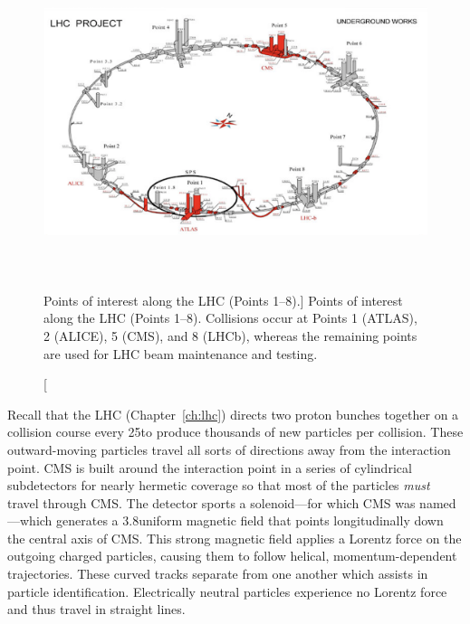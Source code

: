 \begin{figure}[b]
    \centering
    \includegraphics[height=9cm,keepaspectratio]{figures/cms/lhc_points_with_buildings.png}
        \caption
            [Points of interest along the LHC (Points 1--8).]
            {Points of interest along the LHC (Points 1--8).
            Collisions occur at Points 1 (ATLAS), 2 (ALICE), 5 (CMS), and 8 (LHCb),
            whereas the remaining points are used for LHC beam maintenance and testing.} 
        \label{fig:lhc_points}
    \end{figure}

Recall that the LHC (Chapter~\ref{ch:lhc}) directs two proton bunches together on a collision course every 25\ns to produce thousands of new particles per \pp collision.
These outward-moving particles travel all sorts of directions away from the interaction point.
CMS is built around the interaction point in a series of cylindrical subdetectors for nearly hermetic coverage so that most of the particles \emph{must} travel through CMS.
The detector sports a solenoid---for which CMS was named---which generates a 3.8\tesla uniform magnetic field that points longitudinally down the central axis of CMS.
This strong magnetic field applies a Lorentz force on the outgoing charged particles, causing them to follow helical, momentum-dependent trajectories.
These curved tracks separate from one another which assists in particle identification.
Electrically neutral particles experience no Lorentz force and thus travel in straight lines.


